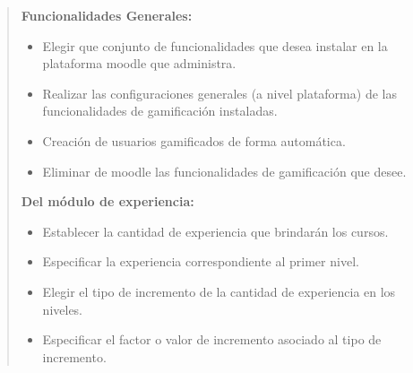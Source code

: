     \begin{quote}
    {\bf Funcionalidades Generales:}
        \begin{itemize}
        \item Elegir que conjunto de funcionalidades que desea instalar
              en la plataforma moodle que administra.
        \item Realizar las configuraciones generales (a nivel plataforma) de las
              funcionalidades de gamificación instaladas.
        \item Creación de usuarios gamificados de forma automática.
        \item Eliminar de moodle las funcionalidades de gamificación que desee.
        \end{itemize}

    {\bf Del módulo de experiencia:}
        \begin{itemize}
        \item Establecer la cantidad de experiencia que brindarán los cursos.
        \item Especificar la experiencia correspondiente al primer nivel.
        \item Elegir el tipo de incremento de la cantidad de experiencia en los niveles.
        \item Especificar el factor o valor de incremento asociado al tipo de incremento.
        \end{itemize}

    \end{quote}


